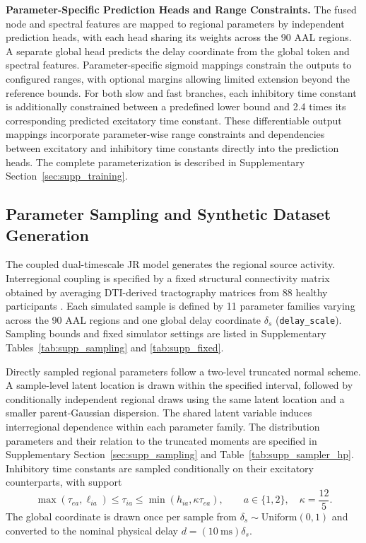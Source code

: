 \documentclass{article}
\begin{document}
{\textbf{Parameter-Specific Prediction Heads and Range Constraints.}
The fused node and spectral features are mapped to regional parameters by independent prediction heads, with each head sharing its weights across the 90 AAL regions.
A separate global head predicts the delay coordinate from the global token and spectral features.
Parameter-specific sigmoid mappings constrain the outputs to configured ranges, with optional margins allowing limited extension beyond the reference bounds.
For both slow and fast branches, each inhibitory time constant is additionally constrained between a predefined lower bound and 2.4 times its corresponding predicted excitatory time constant.
These differentiable output mappings incorporate parameter-wise range constraints and dependencies between excitatory and inhibitory time constants directly into the prediction heads. The complete parameterization is described in Supplementary Section~\ref{sec:supp_training}.

\subsection{Parameter Sampling and Synthetic Dataset Generation}
\label{sec:param_sampling}
The coupled dual-timescale JR model generates the regional source activity. Interregional coupling is specified by a fixed structural connectivity matrix obtained by averaging DTI-derived tractography matrices from 88 healthy participants \citep{skoch2022human}. Each simulated sample is defined by 11 parameter families varying across the 90 AAL regions and one global delay coordinate $\delta_s$ (\texttt{delay\_scale}). Sampling bounds and fixed simulator settings are listed in Supplementary Tables~\ref{tab:supp_sampling} and \ref{tab:supp_fixed}.

Directly sampled regional parameters follow a two-level truncated normal scheme. A sample-level latent location is drawn within the specified interval, followed by conditionally independent regional draws using the same latent location and a smaller parent-Gaussian dispersion. The shared latent variable induces interregional dependence within each parameter family. The distribution parameters and their relation to the truncated moments are specified in Supplementary Section~\ref{sec:supp_sampling} and Table~\ref{tab:supp_sampler_hp}. Inhibitory time constants are sampled conditionally on their excitatory counterparts, with support
\[
\max(\tau_{ea},\ell_{ia})\leq\tau_{ia}
\leq\min(h_{ia},\kappa\tau_{ea}),
\qquad a\in\{1,2\},\quad\kappa=\frac{12}{5}.
\]
The global coordinate is drawn once per sample from $\delta_s\sim\mathrm{Uniform}(0,1)$ and converted to the nominal physical delay $d=(10~\mathrm{ms})\delta_s$.

}
\end{document}
